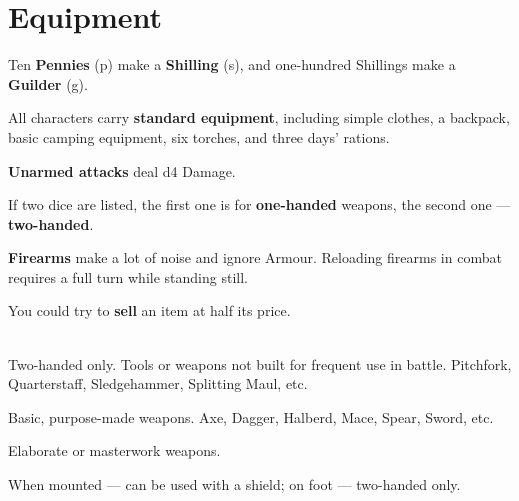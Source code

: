 \documentclass[itdr]{subfiles}
\begin{document}
\vfill


\vfill
\clearpage


\section{Equipment}

Ten \textbf{Pennies} (p) make a \textbf{Shilling} (s), and one-hundred Shillings make a \textbf{Guilder} (g).

\vfill

All characters carry \textbf{standard equipment}, including simple clothes, a backpack, basic camping equipment, six torches, and three days' rations.

\vfill

\textbf{Unarmed attacks} deal d4 Damage.

\vfill

If two dice are listed, the first one is for \textbf{one-handed} weapons, the second one --- \textbf{two-handed}.

\vfill

\textbf{Firearms} make a lot of noise and ignore Armour. Reloading firearms in combat requires a full turn while standing still.

\vfill

You could try to \textbf{sell} an item at half its price.

\vfill


\\Two-handed only. Tools or weapons not built for frequent use in battle. Pitchfork, Quarterstaff, Sledgehammer, Splitting Maul, etc.

 Basic, purpose-made weapons. Axe, Dagger, Halberd, Mace, Spear, Sword, etc.

 Elaborate or masterwork weapons.

 When mounted --- can be used with a shield; on foot --- two-handed only.

\vfill
\end{document}
